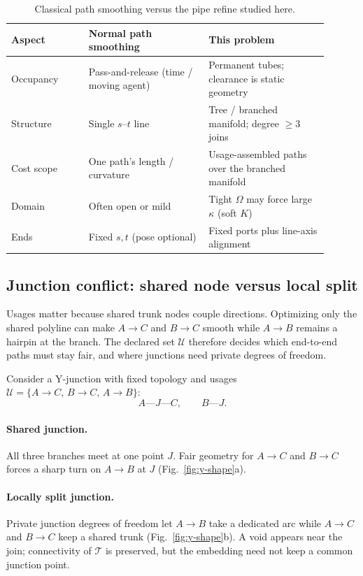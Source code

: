 \begin{table}[H]
  \centering
  \caption{Classical path smoothing versus the pipe refine studied here.}
  \label{tab:vs-smooth}
  \begin{tabular}{@{}p{0.22\linewidth}p{0.34\linewidth}p{0.34\linewidth}@{}}
    \toprule
    Aspect & Normal path smoothing & This problem \\
    \midrule
    Occupancy
      & Pass-and-release (time / moving agent)
      & Permanent tubes; clearance is static geometry \\
    Structure
      & Single $s$--$t$ line
      & Tree / branched manifold; degree $\ge 3$ joins \\
    Cost scope
      & One path's length / curvature
      & Usage-assembled paths over the branched manifold \\
    Domain
      & Often open or mild
      & Tight $\Omega$ may force large $\kappa$ (soft $K$) \\
    Ends
      & Fixed $s,t$ (pose optional)
      & Fixed ports plus line-axis alignment \\
    \bottomrule
  \end{tabular}
\end{table}

\subsection{Junction conflict: shared node versus local split}
\label{sec:problem:junction}

Usages matter because shared trunk nodes couple directions.
Optimizing only the shared polyline can make $A\!\to\!C$ and $B\!\to\!C$ smooth
while $A\!\to\!B$ remains a hairpin at the branch.
The declared set $\mathcal{U}$ therefore decides which end-to-end paths must stay
fair, and where junctions need private degrees of freedom.

Consider a Y-junction with fixed topology and usages
$\mathcal{U}=\{A\!\to\!C,\, B\!\to\!C,\, A\!\to\!B\}$:
\[
A\text{---}J\text{---}C,\qquad B\text{---}J.
\]

\paragraph{Shared junction.}
All three branches meet at one point $J$.
Fair geometry for $A\!\to\!C$ and $B\!\to\!C$ forces a sharp turn on
$A\!\to\!B$ at $J$ (Fig.~\ref{fig:y-shape}a).

\paragraph{Locally split junction.}
Private junction degrees of freedom let $A\!\to\!B$ take a dedicated arc while
$A\!\to\!C$ and $B\!\to\!C$ keep a shared trunk (Fig.~\ref{fig:y-shape}b).
A void appears near the join; connectivity of $\mathcal{T}$ is preserved, but
the embedding need not keep a common junction point.

